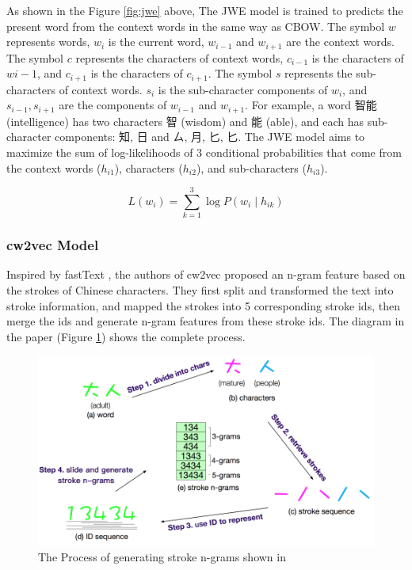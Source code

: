 As shown in the Figure \ref{fig:jwe} above, The JWE model is trained to predicts the present word from the context words in the same way as CBOW. The symbol $w$ represents words, $w_i$ is the current word, $w_{i-1}$ and $w_{i+1}$ are the context words. The symbol $c$ represents the characters of context words, $c_{i-1}$ is the characters of $w{i-1}$, and $c_{i+1}$ is the characters of $c_{i+1}$. The symbol $s$ represents the sub-characters of context words. $s_i$ is the sub-character components of $w_i$, and $s_{i-1}, s_{i+1}$ are the components of $w_{i-1}$ and $w_{i+1}$. For example, a word 智能 (intelligence) has two characters 智 (wisdom) and 能 (able), and each has sub-character components: 知, 日 and ㄙ, 月, 匕, 匕. The JWE model aims to maximize the sum of log-likelihoods of 3 conditional probabilities that come from the context words ($h_{i1}$), characters ($h_{i2}$), and sub-characters ($h_{i3}$).

\begin{equation}
L(w_i) = \sum_{k=1}^3\log P(w_i\mid h_{ik})    
\end{equation}

\subsubsection{cw2vec Model}

Inspired by fastText \cite{bojanowski2017enriching}, the authors of cw2vec \cite{cao2018cw2vec} proposed an n-gram feature based on the strokes of Chinese characters. They first split and transformed the text into stroke information, and mapped the strokes into 5 corresponding stroke ids, then merge the ids and generate n-gram features from these stroke ids. The diagram in the paper (Figure \ref{fig:cw2vec1}) shows the complete process.

\begin{figure}[h]
	\centering
	\includegraphics[scale=0.6]{../images/cw2vec_illustration1.png}
	\caption{The Process of generating stroke n-grams shown in \cite{cao2018cw2vec}}
	\label{fig:cw2vec1}
\end{figure}

